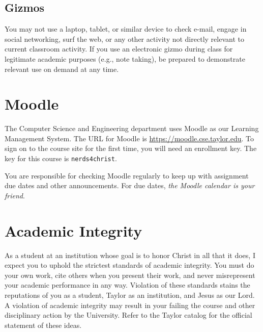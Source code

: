 \documentclass[11pt]{article}
\begin{document}
\subsection{Gizmos}

You may not use a laptop, tablet, or similar device to check e-mail, engage in social
networking, surf the web, or any other activity not directly relevant
to current classroom activity.
If you use an electronic gizmo during class for legitimate academic purposes
(e.g., note taking), be prepared to demonstrate relevant use on demand
at any time.

\section{Moodle}

The Computer Science and Engineering department uses Moodle
as our Learning Management System.
The URL for Moodle is \url{https://moodle.cse.taylor.edu}.
To sign on to the course site for the first time,
you will need an enrollment key.
The key for this course is
\texttt{nerds4christ}.

You are responsible for checking Moodle regularly
to keep up with assignment due dates and other announcements.
For due dates, \emph{the Moodle calendar is your friend}.

\section{Academic Integrity}

As a student at an institution whose goal is to honor Christ in all that it does,
I expect you to uphold the strictest standards of academic integrity.
You must do your own work,
cite others when you present their work,
and never misrepresent your academic performance in any way.
Violation of these standards stains the reputations of you as a student,
Taylor as an institution,
and Jesus as our Lord.
A violation of academic integrity may result in your failing the course
and other disciplinary action by the University.
Refer to the Taylor catalog for the official statement of these ideas.
\end{document}
